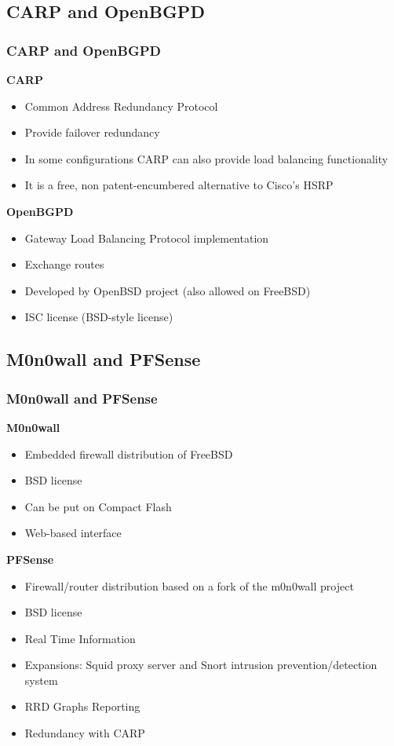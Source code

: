 \documentclass{beamer}
\begin{document}
  \subsection{CARP and OpenBGPD}
  \begin{frame}
    \frametitle{CARP and OpenBGPD}
    \textbf{CARP}
    \begin{itemize}
      \item Common Address Redundancy Protocol
      \item Provide failover redundancy
      \item In some configurations CARP can also provide load balancing functionality
      \item It is a free, non patent-encumbered alternative to Cisco's HSRP
    \end{itemize}
    \textbf{OpenBGPD}
    \begin{itemize}
      \item Gateway Load Balancing Protocol implementation
      \item Exchange routes
      \item Developed by OpenBSD project (also allowed on FreeBSD)
      \item ISC license (BSD-style license)
    \end{itemize}
  \end{frame}
  
  \subsection{M0n0wall and PFSense}
  \begin{frame}
    \frametitle{M0n0wall and PFSense}
    \textbf{M0n0wall}
    \begin{itemize}
      \item Embedded firewall distribution of FreeBSD
      \item BSD license
      \item Can be put on Compact Flash
      \item Web-based interface
    \end{itemize}
    \textbf{PFSense}
    \begin{itemize}
      \item Firewall/router distribution based on a fork of the m0n0wall project
      \item BSD license
      \item Real Time Information
      \item Expansions: Squid proxy server and Snort intrusion prevention/detection system
      \item RRD Graphs Reporting
      \item Redundancy with CARP
    \end{itemize}
  \end{frame}
\end{document}
